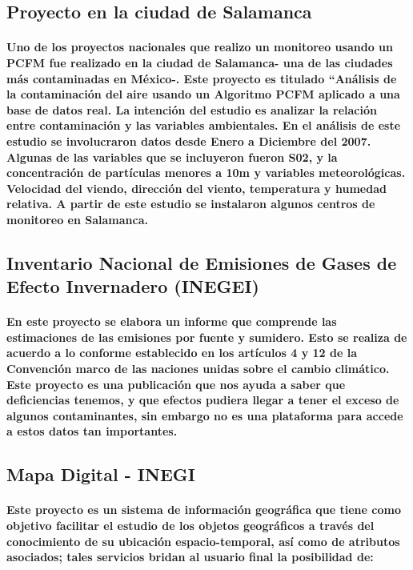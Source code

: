     \subsection {Proyecto en la ciudad de Salamanca}
    \paragraph {Uno de los proyectos nacionales que realizo un monitoreo usando un PCFM fue realizado en la ciudad de Salamanca- una de las ciudades más contaminadas en México-.  Este proyecto es titulado “Análisis de la contaminación del aire usando un Algoritmo PCFM  aplicado a una base de datos real. La intención del estudio es analizar la relación entre contaminación y las variables ambientales. En el análisis de este estudio se involucraron datos desde Enero a Diciembre del 2007. Algunas de las variables que se incluyeron fueron S02, y la concentración de partículas menores a 10m y variables meteorológicas. Velocidad del viendo, dirección del viento, temperatura y humedad relativa. A partir de este estudio se instalaron algunos centros de monitoreo en Salamanca.}

    \subsection {Inventario Nacional de Emisiones de Gases de Efecto Invernadero (INEGEI)}
    \paragraph {En este proyecto se elabora un informe que comprende las estimaciones de las emisiones por fuente y sumidero. Esto se realiza de acuerdo a lo conforme establecido en los artículos 4 y 12 de la Convención marco de las naciones unidas sobre el cambio climático. Este proyecto es una publicación que nos ayuda a saber que deficiencias tenemos, y que efectos pudiera llegar a tener el exceso de algunos contaminantes, sin embargo no es una plataforma para accede a estos datos tan importantes.}

    \subsection {Mapa Digital -  INEGI}
    \paragraph {Este proyecto es un sistema de información geográfica que tiene como objetivo facilitar el estudio de los objetos geográficos a través del conocimiento de su ubicación espacio-temporal, así como de atributos asociados;  tales servicios bridan al usuario final la posibilidad de:}

